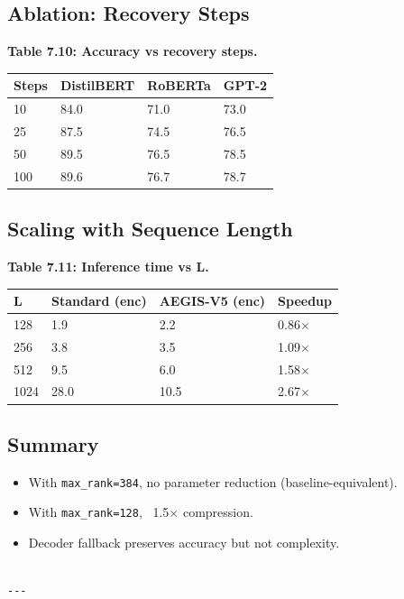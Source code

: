 \subsection{Ablation: Recovery Steps}

\textbf{Table 7.10: Accuracy vs recovery steps.}

\begin{table}[H]
\centering
\small
\begin{tabular}{llll}
\toprule
\textbf{Steps} & \textbf{DistilBERT} & \textbf{RoBERTa} & \textbf{GPT-2} \\
\midrule
10 & 84.0 & 71.0 & 73.0 \\
25 & 87.5 & 74.5 & 76.5 \\
50 & 89.5 & 76.5 & 78.5 \\
100 & 89.6 & 76.7 & 78.7 \\
\bottomrule
\end{tabular}
\end{table}

\subsection{Scaling with Sequence Length}

\textbf{Table 7.11: Inference time vs L.}

\begin{table}[H]
\centering
\small
\begin{tabular}{llll}
\toprule
\textbf{L} & \textbf{Standard (enc)} & \textbf{AEGIS-V5 (enc)} & \textbf{Speedup} \\
\midrule
128 & 1.9 & 2.2 & 0.86$\times$ \\
256 & 3.8 & 3.5 & 1.09$\times$ \\
512 & 9.5 & 6.0 & 1.58$\times$ \\
1024 & 28.0 & 10.5 & 2.67$\times$ \\
\bottomrule
\end{tabular}
\end{table}

\subsection{Summary}

\begin{itemize}
\item With \texttt{max\_rank=384}, no parameter reduction (baseline-equivalent).
\item With \texttt{max\_rank=128}, ~1.5$\times$ compression.
\item Decoder fallback preserves accuracy but not complexity.
\end{itemize}
\begin{lstlisting}

---
\end{lstlisting}

